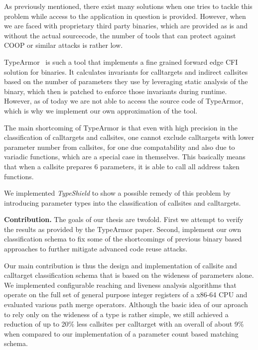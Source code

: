 As previously mentioned, there exist many solutions when one tries to tackle this problem while access to the application in question is provided. However, when we are faced with proprietary third party binaries, which are provided as is and without the actual sourcecode, the number of tools that can protect against COOP or similar attacks is rather low.

TypeArmor~\cite{veen:typearmor} is such a tool that implements a fine grained forward edge CFI solution for binaries. It calculates invariants for calltargets and indirect callsites based on the number of parameters they use by leveraging static analysis of the binary, which then is patched to enforce those invariants during runtime. However, as of today we are not able to access the source code of TypeArmor, which is why we implement our own approximation of the tool.

The main shortcoming of TypeArmor is that even with high precision in the classification of calltargets and callsites, one cannot exclude calltargets with lower parameter number from callsites, for one due compatability and also due to variadic functions, which are a special case in themselves. This basically means that when a callsite prepares 6 parameters, it is able to call all address taken functions.


We implemented \textit{TypeShield} to show a possible remedy of this problem by introducing parameter types into the classification of callsites and calltargets. 

\textbf{Contribution.}
\label{Contribution}
The goals of our thesis are twofold. First we attempt to verify the results as provided by the TypeArmor paper. Second, implement our own classification schema to fix some of the shortcomings of previous binary based approaches to further mitigate advanced code reuse attacks.

Our main contribution is thus the design and implementation of callsite and calltarget classification schema that is based on the wideness of parameters alone. We implemented configurable reaching and liveness analysis algorithms that operate on the full set of general purpose integer registers of a x86-64 CPU and evaluated various path merge operators. Although the basic idea of our aproach to rely only on the wideness of a type is rather simple, we still achieved a reduction of up to 20\% less callsites per calltarget with an overall of about 9\% when compared to our implementation of a parameter count based matching schema.



